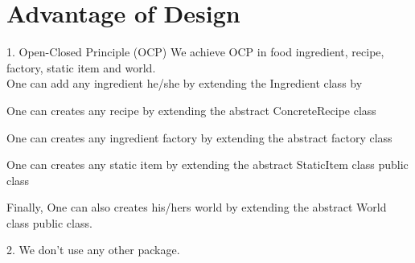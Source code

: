\usepackage{color}



\section{Advantage of Design}

1.	Open-Closed Principle (OCP)
    We achieve OCP in food ingredient, recipe, factory, static item and world.\\
    One can add any ingredient he/she by extending the Ingredient class by 


One can creates any recipe by extending the abstract ConcreteRecipe class


One can creates any ingredient factory by extending the abstract factory class


One can creates any static item by extending the abstract StaticItem class public class


Finally, One can also creates his/hers world by extending the abstract World class public class.

2. We don't use any other package.
